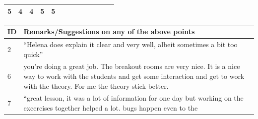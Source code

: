 \documentclass[paper=a4,justified,a4paper]{tufte-handout}
\begin{document}
\begin{longtable}[]{@{}lllllllllllll@{}}
\begin{minipage}[t]{0.04\columnwidth}
5\strut
\end{minipage} & \begin{minipage}[t]{0.07\columnwidth}\raggedright
4\strut
\end{minipage} & \begin{minipage}[t]{0.07\columnwidth}\raggedright
4\strut
\end{minipage} & \begin{minipage}[t]{0.07\columnwidth}\raggedright
5\strut
\end{minipage} & \begin{minipage}[t]{0.07\columnwidth}\raggedright
5\strut
\end{minipage}\tabularnewline
\bottomrule
\end{longtable}

\begin{longtable}[]{@{}ll@{}}
\toprule
\begin{minipage}[b]{0.04\columnwidth}\raggedright
ID\strut
\end{minipage} & \begin{minipage}[b]{0.90\columnwidth}\raggedright
Remarks/Suggestions on any of the above points\strut
\end{minipage}\tabularnewline
\midrule
\endhead
\begin{minipage}[t]{0.04\columnwidth}\raggedright
2\strut
\end{minipage} & \begin{minipage}[t]{0.90\columnwidth}\raggedright
\scriptsize ``Helena does explain it clear and very well, albeit
sometimes a bit too quick''\strut
\end{minipage}\tabularnewline
\begin{minipage}[t]{0.04\columnwidth}\raggedright
6\strut
\end{minipage} & \begin{minipage}[t]{0.90\columnwidth}\raggedright
\scriptsize you're doing a great job. The breakout rooms are very nice.
It is a nice way to work with the students and get some interaction and
get to work with the theory. For me the theory stick better.\strut
\end{minipage}\tabularnewline
\begin{minipage}[t]{0.04\columnwidth}\raggedright
7\strut
\end{minipage} & \begin{minipage}[t]{0.90\columnwidth}\raggedright
\scriptsize ``great lesson, it was a lot of information for one day but
working on the excercises together helped a lot. bugs happen even to the

\end{minipage}
\end{longtable}
\end{document}
